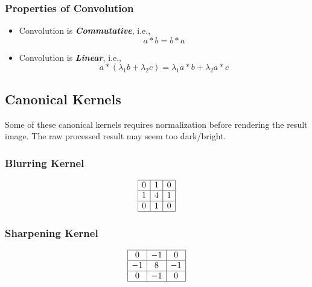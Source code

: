 \documentclass[11pt]{article}
\begin{document}
\subsubsection{Properties of Convolution}
\begin{itemize}
    \item Convolution is \textit{\textbf{Commutative}}, i.e.,
        \begin{equation}
            a * b=b * a
        \end{equation} 
    \item Convolution is \textit{\textbf{Linear}}, i.e., 
        \begin{equation}
            a *\left(\lambda_{1} b+\lambda_{2} c\right)=\lambda_{1} a * b+\lambda_{2} a * c
        \end{equation}
\end{itemize}

\subsection{Canonical Kernels}Some of these canonical kernels requires normalization before rendering the result image. The raw processed result may seem too dark/bright.
\subsubsection{Blurring Kernel}
\begin{equation}
    \begin{array}{|c|c|c|}
        \hline 0 & {1} & {0} \\
        \hline 1 & {4} & {1} \\
        \hline 0 & {1} & {0} \\
        \hline
    \end{array}
\end{equation}

\subsubsection{Sharpening Kernel}
\begin{equation}
    \begin{array}{|c|c|c|}
        \hline 0 & {-1} & {0} \\
        \hline -1 & {8} & {-1} \\
        \hline 0 & {-1} & {0} \\
        \hline
    \end{array}
\end{equation}
\end{document}
